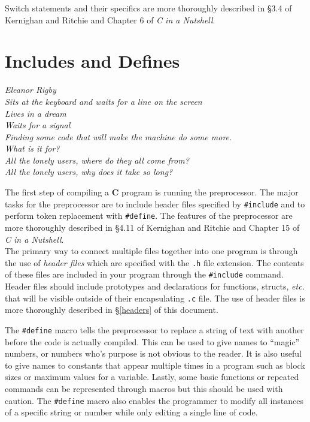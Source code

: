 \documentclass[11pt]{article}
\begin{document}

Switch statements and their specifics are more thoroughly described in \S 3.4 of
Kernighan and Ritchie and Chapter 6 of \emph{C in a Nutshell}.


\section{Includes and Defines}

\textwidth
\epigraph{\emph{Eleanor Rigby \\
Sits at the keyboard and waits for a line on the screen \\
Lives in a dream \\
Waits for a signal \\
Finding some code that will make the machine do some more.  \\
What is it for? \\
All the lonely users, where do they all come from? \\
All the lonely users, why does it take so long?}}{}

\noindent The first step of compiling a \textbf{C} program is running the
preprocessor. The major tasks for the preprocessor are to include header files
specified by \texttt{\#include} and to perform token replacement with
\texttt{\#define}. The features of the preprocessor are more thoroughly
described in \S 4.11 of Kernighan and Ritchie and Chapter 15 of \emph{C in a
Nutshell}.\\

The primary way to connect multiple files together into one program is through
the use of \emph{header files} which are specified with the \texttt{.h} file
extension. The contents of these files are included in your program through the
\texttt{\#include} command. Header files should include prototypes and
declarations for functions, structs, \emph{etc.} that will be visible outside of
their encapsulating \texttt{.c} file. The use of header files is more thoroughly
described in \S\ref{headers} of this document.

The \texttt{\#define} macro tells the preprocessor to replace a string of text
with another before the code is actually compiled. This can be used to give
names to ``magic'' numbers, or numbers who's purpose is not obvious to the
reader.  It is also useful to give names to constants that appear multiple times
in a program such as block sizes or maximum values for a variable. Lastly, some
basic functions or repeated commands can be represented through macros but this
should be used with caution. The \texttt{\#define} macro also enables the
programmer to modify all instances of a specific string or number while only
editing a single line of code.
\end{document}
